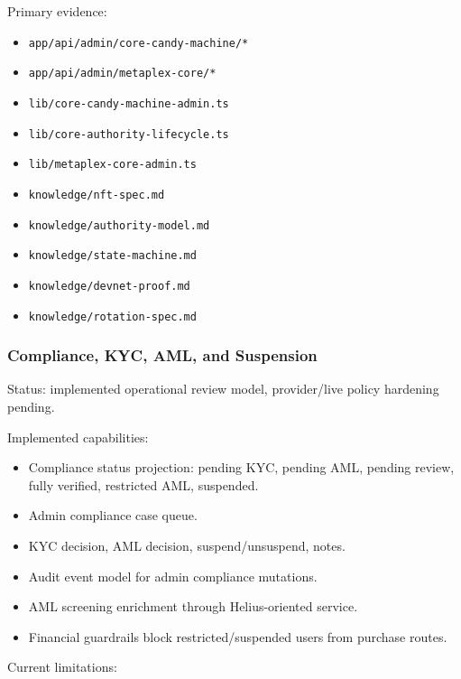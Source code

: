 \documentclass[
  10pt,
  letterpaper,
]{article}
\providecommand{\tightlist}{%
  \setlength{\itemsep}{0pt}\setlength{\parskip}{0pt}}
\let\oldtexttt\texttt
\renewcommand{\texttt}[1]{\oldtexttt{\small #1}}
\begin{document}
Primary evidence:

\begin{itemize}
\tightlist
\item
  \texttt{app/api/admin/core-candy-machine/*}
\item
  \texttt{app/api/admin/metaplex-core/*}
\item
  \texttt{lib/core-candy-machine-admin.ts}
\item
  \texttt{lib/core-authority-lifecycle.ts}
\item
  \texttt{lib/metaplex-core-admin.ts}
\item
  \texttt{knowledge/nft-spec.md}
\item
  \texttt{knowledge/authority-model.md}
\item
  \texttt{knowledge/state-machine.md}
\item
  \texttt{knowledge/devnet-proof.md}
\item
  \texttt{knowledge/rotation-spec.md}
\end{itemize}

\subsubsection{Compliance, KYC, AML, and
Suspension}\label{compliance-kyc-aml-and-suspension}

Status: implemented operational review model, provider/live policy
hardening pending.

Implemented capabilities:

\begin{itemize}
\tightlist
\item
  Compliance status projection: pending KYC, pending AML, pending
  review, fully verified, restricted AML, suspended.
\item
  Admin compliance case queue.
\item
  KYC decision, AML decision, suspend/unsuspend, notes.
\item
  Audit event model for admin compliance mutations.
\item
  AML screening enrichment through Helius-oriented service.
\item
  Financial guardrails block restricted/suspended users from purchase
  routes.
\end{itemize}

Current limitations:
\end{document}
